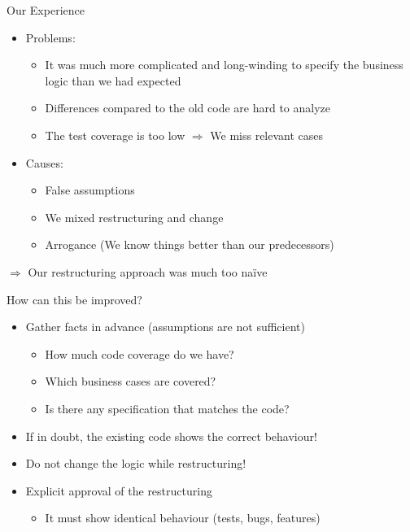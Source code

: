 \begin{frame}[fragile]{Our Experience}
\begin{itemize}
\item Problems:
\begin{itemize}
\item It was much more complicated and long-winding to specify the business logic than we had expected
\item Differences compared to the old code are hard to analyze
\item The test coverage is too low \newline $\Rightarrow$ We miss relevant cases 
\end{itemize}
\end{itemize}

\begin{itemize}
\item Causes:
\begin{itemize}
\item False assumptions
\item We mixed restructuring and change
\item Arrogance (\glqq We know things better than our predecessors\grqq{})
\end{itemize}
\end{itemize}

$\Rightarrow$ Our restructuring approach was much too na\"ive

\end{frame}


\begin{frame}[fragile]{How can this be improved?}
\begin{itemize}
\item Gather facts in advance (assumptions are not sufficient)
\begin{itemize}
\item How much code coverage do we have?
\item Which business cases are covered?
\item Is there any specification that matches the code?
\end{itemize}

\item If in doubt, the existing code shows the correct behaviour!

\item Do not change the logic while restructuring!

\item Explicit approval of the restructuring
\begin{itemize}
\item It must show identical behaviour (tests, bugs, features)
\end{itemize}

\end{itemize}
\end{frame}



